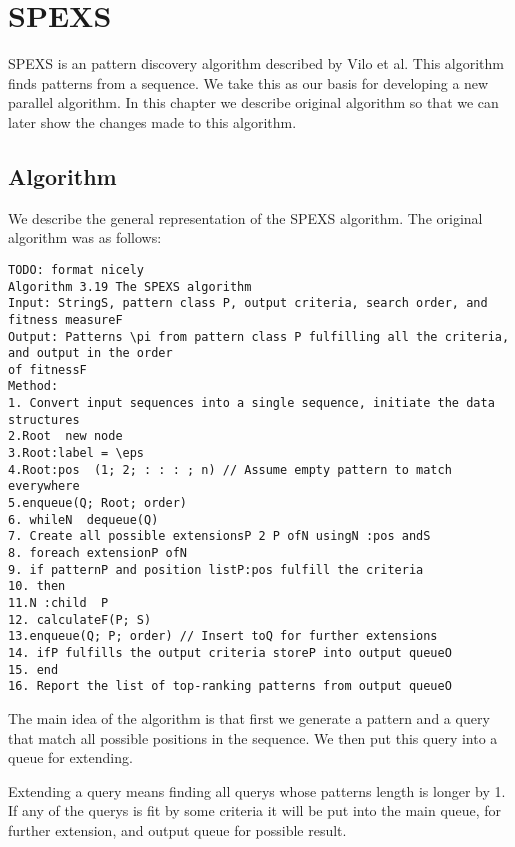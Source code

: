 \chapter{SPEXS}

SPEXS is an pattern discovery algorithm described by Vilo et al.
This algorithm finds patterns from a sequence.
We take this as our basis for developing a new parallel algorithm.
In this chapter we describe original algorithm so that we can
later show the changes made to this algorithm.

\section{Algorithm}

We describe the general representation of the SPEXS algorithm. 
The original algorithm was as follows:

\begin{verbatim}
TODO: format nicely
Algorithm 3.19 The SPEXS algorithm
Input: StringS, pattern class P, output criteria, search order, and fitness measureF
Output: Patterns \pi from pattern class P fulfilling all the criteria, and output in the order
of fitnessF
Method:
1. Convert input sequences into a single sequence, initiate the data structures
2.Root  new node
3.Root:label = \eps
4.Root:pos  (1; 2; : : : ; n) // Assume empty pattern to match everywhere
5.enqueue(Q; Root; order)
6. whileN  dequeue(Q)
7. Create all possible extensionsP 2 P ofN usingN :pos andS
8. foreach extensionP ofN
9. if patternP and position listP:pos fulfill the criteria
10. then
11.N :child  P
12. calculateF(P; S)
13.enqueue(Q; P; order) // Insert toQ for further extensions
14. ifP fulfills the output criteria storeP into output queueO
15. end
16. Report the list of top-ranking patterns from output queueO
\end{verbatim}

The main idea of the algorithm is that first we generate a 
pattern and a query that match all possible positions in 
the sequence. We then put this query into a queue for extending.

Extending a query means finding all querys whose patterns length
is longer by 1. If any of the querys is fit by some criteria
it will be put into the main queue, for further extension, 
and output queue for possible result.